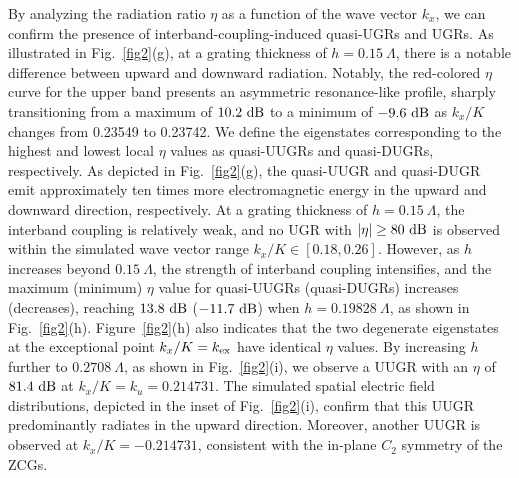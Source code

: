 \documentclass[%
 reprint,
superscriptaddress,
 amsmath,amssymb, aps,
]{revtex4-1}
\begin{document}
By analyzing the radiation ratio $\eta$ as a function of the wave vector $k_x$, we can confirm the presence of interband-coupling-induced quasi-UGRs and UGRs. As illustrated in Fig.~\ref{fig2}(g), at a grating thickness of $h=0.15~\Lambda$, there is a notable difference between upward and downward radiation. Notably, the red-colored $\eta$ curve for the upper band presents an asymmetric resonance-like profile, sharply transitioning from a maximum of $10.2~\rm{dB}$ to a minimum of $-9.6~\rm{dB}$ as $k_x /K $ changes from 0.23549 to 0.23742. We define the eigenstates corresponding to the highest and lowest local $\eta$ values as quasi-UUGRs and quasi-DUGRs, respectively. As depicted in Fig.~\ref{fig2}(g), the quasi-UUGR and quasi-DUGR emit approximately ten times more electromagnetic energy in the upward and downward direction, respectively. At a grating thickness of $h=0.15~\Lambda$, the interband coupling is relatively weak, and no UGR with $|\eta|\geq 80~\rm{dB}$ is observed within the simulated wave vector range $k_x /K \in [0.18, 0.26]$. However, as $h$ increases beyond $0.15~\Lambda$, the strength of interband coupling intensifies, and the maximum (minimum) $\eta$ value for quasi-UUGRs (quasi-DUGRs) increases (decreases), reaching $13.8~\rm{dB}$ ($-11.7~\rm{dB}$) when $h=0.19828~\Lambda$, as shown in Fig.~\ref{fig2}(h). Figure~\ref{fig2}(h) also indicates that the two degenerate eigenstates at the exceptional point $k_x/K=k_{\rm{ex}}$ have identical $\eta$ values. By increasing $h$ further to $0.2708~\Lambda$, as shown in Fig.~\ref{fig2}(i), we observe a UUGR with an $\eta$ of  $81.4~\rm{dB}$ at $k_x/K = k_u=0.214731$. The simulated spatial electric field distributions, depicted in the inset of Fig.~\ref{fig2}(i), confirm that this UUGR predominantly radiates in the upward direction. Moreover, another UUGR is observed at $k_x /K =-0.214731$, consistent with the in-plane $C_2$ symmetry of the ZCGs.
\end{document}
